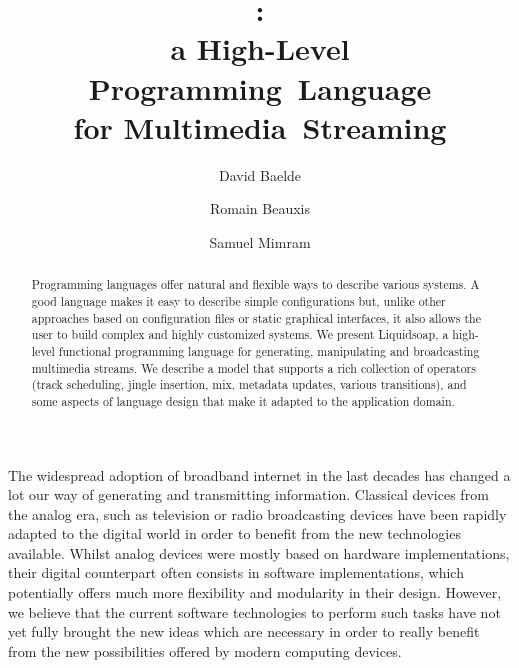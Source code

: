 \documentclass{llncs}
\title{\liquidsoap{}:\\
  a High-Level Programming~Language\\
  for Multimedia~Streaming}
\author{David Baelde\inst{1} \and Romain Beauxis\inst{2} \and Samuel Mimram\inst{3}}
\institute{
  University of Minnesota, USA
  \and
  Tulane University, USA
  \and
  CEA LIST -- LMeASI, France
}
\newcommand{\liquidsoap}{Liquidsoap}
\newcommand{\eg}{{e.g.,}}
\begin{document}
\maketitle

\begin{abstract}
Programming languages offer natural and flexible ways to describe various
systems. A good language makes it easy to describe simple configurations but,
unlike other approaches based on configuration files or static graphical
interfaces, it also allows the user to build complex and highly customized systems.
We present \liquidsoap, a high-level functional programming
language for generating, manipulating and broadcasting multimedia streams. We
describe a model that supports a rich collection of operators (track scheduling,
jingle insertion, mix, metadata updates, various transitions), and some aspects
of language design that make it adapted to the application domain.
\end{abstract}

The widespread adoption of broadband internet in the last decades has
changed a lot our way of generating and transmitting information. Classical
devices from the analog era, such as television or radio broadcasting devices
have been rapidly adapted to the digital world in order to benefit from the new
technologies available. Whilst analog devices were mostly based on hardware
implementations, their digital counterpart often consists in software
implementations,
which potentially offers much more flexibility and modularity in their design.
However, we believe that the current software technologies to perform such tasks
have not yet fully brought the new ideas which are necessary in order to really
benefit from the new possibilities offered by modern computing devices.
\end{document}
